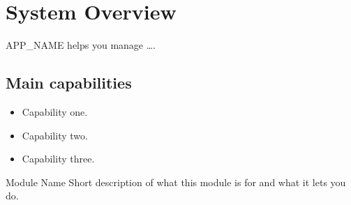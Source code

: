 \section{System Overview}

APP\_NAME helps you manage \ldots.

\subsection{Main capabilities}
\begin{itemize}
  \item Capability one.
  \item Capability two.
  \item Capability three.
\end{itemize}

\begin{ugModule}{Module Name}
  Short description of what this module is for and what it lets you do.
\end{ugModule}
